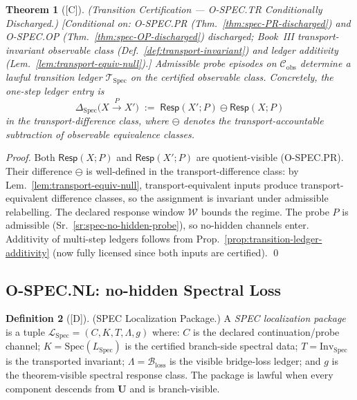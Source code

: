 \documentclass[12pt,oneside]{amsbook}
\theoremstyle{plain}
\newtheorem{theorem}{Theorem}[section]
\theoremstyle{definition}
\newtheorem{definition}[theorem]{Definition}
\theoremstyle{remark}
\newcommand{\status}[1]{\textup{[#1]}}
\begin{document}
\begin{theorem}[\status{C}]\label{thm:spec-TR-discharged}
\textup{(Transition Certification --- O-SPEC.TR Conditionally Discharged.)}
\textup{[Conditional on: O-SPEC.PR (Thm.~\ref{thm:spec-PR-discharged})
and O-SPEC.OP (Thm.~\ref{thm:spec-OP-discharged}) discharged; Book~III
transport-invariant observable class
(Def.~\ref{def:transport-invariant}) and ledger additivity
(Lem.~\ref{lem:transport-equiv-null}).]}
Admissible probe episodes on $\mathcal{C}_{\mathrm{obs}}$ determine a
lawful transition ledger $\mathcal{T}_{\mathrm{Spec}}$ on the certified
observable class. Concretely, the one-step ledger entry is
\[
 \Delta_{\mathrm{Spec}}\!\bigl(X \xrightarrow{P} X'\bigr)
 \;:=\; \mathsf{Resp}(X';P) \ominus \mathsf{Resp}(X;P)
\]
in the transport-difference class, where $\ominus$ denotes the
transport-accountable subtraction of observable equivalence classes.
\end{theorem}

\begin{proof}
Both $\mathsf{Resp}(X;P)$ and $\mathsf{Resp}(X';P)$ are quotient-visible
(O-SPEC.PR). Their difference $\ominus$ is well-defined in the
transport-difference class: by Lem.~\ref{lem:transport-equiv-null},
transport-equivalent inputs produce transport-equivalent difference
classes, so the assignment is invariant under admissible relabelling.
The declared response window $\mathcal{W}$ bounds the regime. The probe
$P$ is admissible (Sr.~\ref{sr:spec-no-hidden-probe}), so no-hidden
channels enter. Additivity of multi-step ledgers follows from
Prop.~\ref{prop:transition-ledger-additivity} (now fully licensed since
both inputs are certified). \qed
\end{proof}

\subsection{O-SPEC.NL: no-hidden Spectral Loss}\label{sec:spec-NL}

\begin{definition}[\status{D}]\label{def:spec-localization-package}
\textup{(SPEC Localization Package.)}
A \emph{SPEC localization package} is a tuple
$\mathcal{L}_{\mathrm{Spec}} = (C, K, T, \Lambda, g)$
where: $C$ is the declared continuation/probe channel;
$K = \mathrm{Spec}(L_{\mathrm{Spec}})$ is the certified branch-side
spectral data; $T = \mathrm{Inv}_{\mathrm{Spec}}$ is the transported
invariant; $\Lambda = \mathcal{B}_{\mathrm{loss}}$ is the visible
bridge-loss ledger; and $g$ is the theorem-visible spectral response class.
The package is lawful when every component descends from $\mathbf{U}$
and is branch-visible.
\end{definition}
\end{document}
